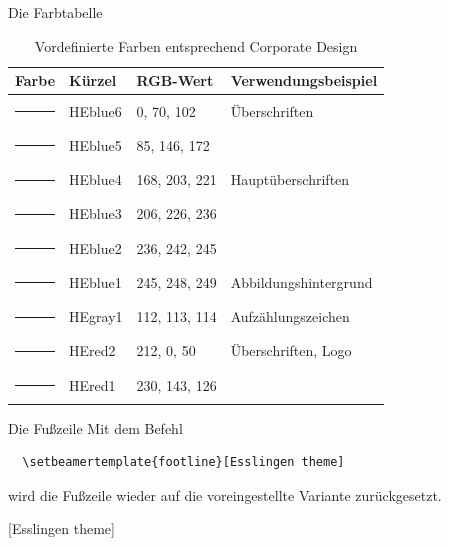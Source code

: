 \begin{frame}{Die Farbtabelle}
\label{frame:Farbtabelle}
\begin{table}[h]
    \centering
    \caption{Vordefinierte Farben entsprechend Corporate Design}
      \begin{tabular}{clll}
        \toprule
        \textbf{Farbe} & \textbf{Kürzel} & \textbf{RGB-Wert} & \textbf{Verwendungsbeispiel} \\
        \midrule
        \color{HEblue6}\rule{30pt}{8pt} & HEblue6 &    0,   70,  102 & Überschriften \\
        \color{HEblue5}\rule{30pt}{8pt} & HEblue5 &   85,  146,  172 &  \\
        \color{HEblue4}\rule{30pt}{8pt} & HEblue4 &  168,  203,  221 & Hauptüberschriften \\
        \color{HEblue3}\rule{30pt}{8pt} & HEblue3 &  206,  226,  236 &  \\
        \color{HEblue2}\rule{30pt}{8pt} & HEblue2 &  236,  242,  245 &  \\
        \color{HEblue1}\rule{30pt}{8pt} & HEblue1 &  245,  248,  249 & Abbildungshintergrund \\
        \color{HEgray1}\rule{30pt}{8pt} & HEgray1 &  112,  113,  114 & Aufzählungszeichen \\
        \color{HEred2}\rule{30pt}{8pt}  & HEred2  &  212,    0,   50 & Überschriften, Logo \\
        \color{HEred1}\rule{30pt}{8pt}  & HEred1  &  230,  143,  126 &  \\
        \bottomrule
      \end{tabular}
  \end{table}
\end{frame}

% 

\begin{frame}[fragile]{Die Fußzeile}
  Mit dem Befehl
\begin{verbatim}
  \setbeamertemplate{footline}[Esslingen theme]
\end{verbatim}
  wird die Fußzeile wieder auf die voreingestellte Variante zurückgesetzt.
\end{frame}

[Esslingen theme]

